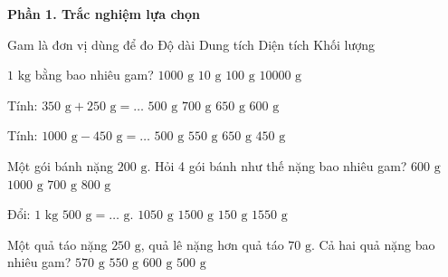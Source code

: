 \textbf{Phần 1. Trắc nghiệm lựa chọn}

\begin{ex} %
Gam là đơn vị dùng để đo
\choice
{Độ dài}
{Dung tích}
{Diện tích}
{\True Khối lượng}
\end{ex}

\begin{ex} %
$1\text{ kg}$ bằng bao nhiêu gam?
\choice
{\True $1000\text{ g}$}
{$10\text{ g}$}
{$100\text{ g}$}
{$10000\text{ g}$}
\end{ex}

\begin{ex} %
Tính: $350\text{ g} + 250\text{ g} = \dots$
\choice
{$500\text{ g}$}
{$700\text{ g}$}
{$650\text{ g}$}
{\True $600\text{ g}$}
\end{ex}

\begin{ex} %
Tính: $1000\text{ g} - 450\text{ g} = \dots$
\choice
{$500\text{ g}$}
{\True $550\text{ g}$}
{$650\text{ g}$}
{$450\text{ g}$}
\end{ex}

\begin{ex} %
Một gói bánh nặng $200\text{ g}$. Hỏi 4 gói bánh như thế nặng bao nhiêu gam?
\choice
{$600\text{ g}$}
{$1000\text{ g}$}
{$700\text{ g}$}
{\True $800\text{ g}$}
\end{ex}

\begin{ex} %
Đổi: $1\text{ kg } 500\text{ g} = \dots\text{ g}$.
\choice
{$1050\text{ g}$}
{\True $1500\text{ g}$}
{$150\text{ g}$}
{$1550\text{ g}$}
\end{ex}

\begin{ex} %
Một quả táo nặng $250\text{ g}$, quả lê nặng hơn quả táo $70\text{ g}$. Cả hai quả nặng bao nhiêu gam?
\choice
{\True $570\text{ g}$}
{$550\text{ g}$}
{$600\text{ g}$}
{$500\text{ g}$}
\end{ex}

